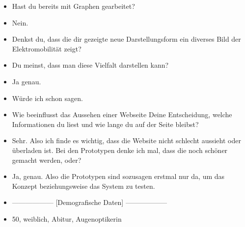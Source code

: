 {\begin{itemize}[]
              Dann, nachdem man sich eingearbeitet hat, denke ich, dass der Graph auch sehr gut ist.
        \item {} Hast du bereits mit Graphen gearbeitet?
        \item {} Nein.
        \item {} Denkst du, dass die dir gezeigte neue Darstellungsform ein diverses Bild der Elektromobilität zeigt?
        \item {} Du meinst, dass man diese Vielfalt darstellen kann?
        \item {} Ja genau.
        \item {} Würde ich schon sagen.
        \item {} Wie beeinflusst das Aussehen einer Webseite Deine Entscheidung, welche Informationen du liest und wie lange du auf der Seite bleibst?
        \item {} Sehr.
              Also ich finde es wichtig, dass die Website nicht schlecht aussieht oder überladen ist.
              Bei den Prototypen denke ich mal, dass die noch schöner gemacht werden, oder?
        \item {} Ja, genau. Also die Prototypen sind sozusagen erstmal nur da, um das Konzept beziehungsweise das System zu testen.
        \item {------------------} [Demografische Daten] {------------------}
        \item {} 50, weiblich, Abitur, Augenoptikerin
    \end{itemize}}
\nolinenumbers
